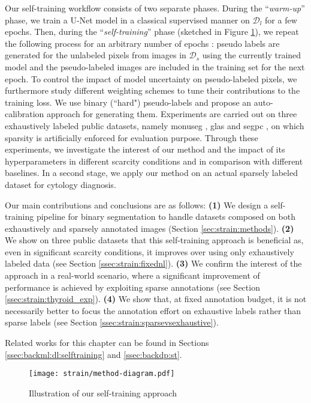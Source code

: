 Our self-training workflow consists of two separate phases. During the ``\textit{warm-up}'' phase, we train a U-Net \parencite{ronneberger2015unet} model in a classical supervised manner on $\mathcal{D}_l$ for a few epochs. Then, during the ``\textit{self-training}'' phase (sketched in Figure \ref{fig:strain:method_diagram}), we repeat the following process for an arbitrary number of epochs : pseudo labels are generated for the unlabeled pixels from images in $\mathcal{D}_s$ using the currently trained model and the pseudo-labeled images are included in the training set for the next epoch. To control the impact of model uncertainty on pseudo-labeled pixels, we furthermore study different weighting schemes to tune their contributions to the training loss. We use binary (``hard") pseudo-labels and propose an auto-calibration approach for generating them. Experiments are carried out on three exhaustively labeled public datasets, namely \acrshort{monuseg} \parencite{kumar2019multi}, \acrshort{glas} \parencite{sirinukunwattana2017gland} and \acrshort{segpc} \parencite{gupta2021segpc}, on which sparsity is artificially enforced for evaluation purpose. Through these experiments, we investigate the interest of our method and the impact of its hyperparameters in different scarcity conditions and in comparison with different baselines. In a second stage, we apply our method on an actual sparsely labeled dataset for cytology diagnosis.

Our main contributions and conclusions are as follows: \textbf{(1)} We design a self-training pipeline for binary segmentation to handle datasets composed on both exhaustively and sparsely annotated images (Section \ref{sec:strain:methods}). \textbf{(2)} We show on three public datasets that this self-training approach is beneficial as, even in significant scarcity conditions, it improves over using only exhaustively labeled data (see Section \ref{ssec:strain:fixednl}). \textbf{(3)} We confirm the interest of the approach in a real-world scenario, where a significant improvement of performance is achieved by exploiting sparse annotations (see Section \ref{ssec:strain:thyroid_exp}). \textbf{(4)} We show that, at fixed annotation budget, it is not necessarily better to focus the annotation effort on exhaustive labels rather than sparse labels (see Section \ref{ssec:strain:sparsevsexhaustive}).

Related works for this chapter can be found in Sections \ref{ssec:backml:dl:selftraining} and \ref{ssec:backdp:st}.

\begin{figure}
  \centering
  \texttt{[image: strain/method-diagram.pdf]}
  \caption{Illustration of our self-training approach}
  \label{fig:strain:method_diagram}
\end{figure}

